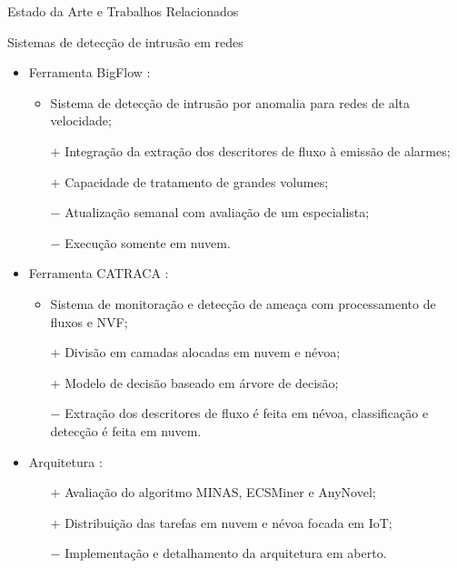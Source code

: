 \documentclass[aspectratio=1610,10pt]{beamer}
\begin{document}
\begin{frame}[fragile]{Estado da Arte e Trabalhos Relacionados}
\begin{alertblock}{Sistemas de detecção de intrusão em redes}
  \begin{itemize}%
    \item Ferramenta BigFlow \cite{Viegas2019}:
    \begin{itemize}
      \item Sistema de detecção de intrusão por anomalia para redes de alta velocidade;
      \item[$\boldsymbol{+}$] Integração da extração dos descritores de fluxo à emissão de alarmes;
      \item[$\boldsymbol{+}$] Capacidade de tratamento de grandes volumes;
      \item[$\boldsymbol{-}$] Atualização semanal com avaliação de um especialista;
      \item[$\boldsymbol{-}$] Execução somente em nuvem.
    \end{itemize}
    \item Ferramenta CATRACA \cite{Lopez2018,Sanz2018}:
    \begin{itemize}
      \item Sistema de monitoração e detecção de ameaça com processamento de fluxos e NVF;
      \item[$\boldsymbol{+}$] Divisão em camadas alocadas em nuvem e névoa;
      \item[$\boldsymbol{+}$] Modelo de decisão baseado em árvore de decisão;
      \item[$\boldsymbol{-}$] Extração dos descritores de fluxo é feita em
      névoa, classificação e detecção é feita em nuvem.
    \end{itemize}
    \item Arquitetura \arch \cite{Cassales2019}:
    \begin{itemize}
      \item[$+$] Avaliação do algoritmo MINAS, ECSMiner e AnyNovel;
      \item[$+$] Distribuição das tarefas em nuvem e névoa focada em IoT;
      \item[$-$] Implementação e detalhamento da arquitetura em aberto.
    \end{itemize}
  \end{itemize}
\end{alertblock}
\end{frame}
\end{document}
